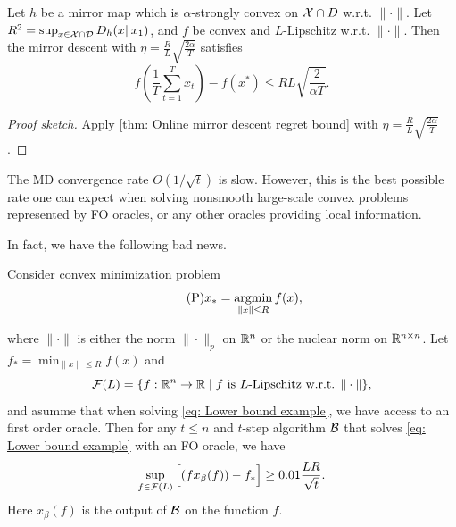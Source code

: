 
\begin{theorem}
\label{thm: Offline mirror descent regret bound}
Let $h$ be a mirror map which is $\alpha$-strongly convex on $\mathcal{X} \cap D$ w.r.t. $\|\cdot \|$. Let $R^2 = \sup_{x\in \mathcal{X} \cap \mathcal{D}} D_h(x\|x_1)$, and $f$ be convex and $L$-Lipschitz w.r.t. $\|\cdot \|$. Then the mirror descent with $\eta = \frac{R}{L}\sqrt{\frac{2\alpha}{T}}$ satisfies 
\[
    f\left(\frac{1}{T} \sum_{t=1}^T x_t\right)-f\left(x^*\right) \leq R L \sqrt{\frac{2}{\alpha T}}. 
\] 
\end{theorem}
\begin{proof}[Proof sketch]
Apply \autoref{thm: Online mirror descent regret bound} with $ \eta = \frac{R}{L}\sqrt{\frac{2\alpha}{T}}$. 
\end{proof}

\begin{note}
The MD convergence rate $O(1 / \sqrt{t})$ is slow. However, this is the best possible rate one can expect when solving nonsmooth large-scale convex problems represented by FO oracles, or any other oracles providing local information.
\end{note}

In fact, we have the following bad news. 

\begin{example}
\label{eg: Lower bound example}
Consider convex minimization problem 
\begin{equation}
\label{eq: Lower bound example}
\tag{P}
        x_* = \mathop{\mathrm{argmin}}_{\|x\|\le R} f(x),
\end{equation}

where $\|\cdot \|$ is either the norm $\|\cdot \|_p$ on $\mathbb{R}^n$ or the nuclear norm on $\mathbb{R}^{n\times n}$. Let $f_* = \min _{\|x\|\le R} f(x)$ and 
\[
    \mathcal{F}(L) = \{f: \mathbb{R}^n \to \mathbb{R} \mid f \text{ is $L$-Lipschitz w.r.t. $\|\cdot \|$}\}, 
\]
and asumme that when solving \eqref{eq: Lower bound example}, we have access to an first order oracle. Then for any $t\le n$ and $t$-step algorithm $\mathcal{B}$ that solves \eqref{eq: Lower bound example} with an FO oracle, we have 
\[
    \sup_{f\in \mathcal{F}(L)} \Big [ (f x_\beta(f)) - f_* \Big]  \ge 0.01 \frac{LR}{\sqrt{t} }.  
\]
Here $x_\beta(f)$ is the output of $\mathcal{B}$ on the function $f$.
\end{example}
